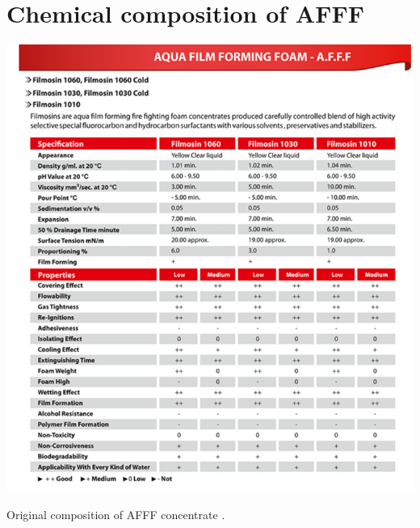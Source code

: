\documentclass[12pt]{report}
\begin{document}


\cleardoublepage
{}
\titleformat{\chapter}{\normalfont\Large\bfseries}{}{0em}{}






\listoffigures
\listoftables

\printnomenclature

\makenomenclature

\setcounter{chapter}{0}
\cleardoublepage
{}
\titleformat{\chapter}[hang]{\normalfont\Large\bfseries}{\chaptertitlename\ \thechapter:}{0.5em}{}











\appendix

\chapter{Chemical composition of AFFF}
\begin{table}[H]
    \centering
    \includegraphics[width=\textwidth]{original_composition_of_afff_concentrate.png}
    \caption{Original composition of AFFF concentrate \cite{hinnant2020characterizing}.}
\end{table}
\end{document}
